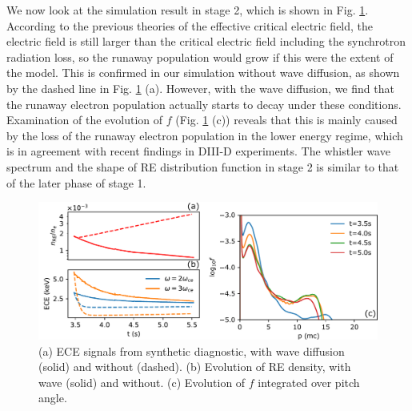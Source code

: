 \documentclass[aps, prl, preprint,english,superscriptaddress]{revtex4-1}
\begin{document}
We now look at the simulation result in stage 2, which is shown in Fig. \ref{fig:after}. According to the previous theories of the effective critical electric field\cite{stahl_effective_2015,aleynikov_theory_2015}, the electric field is still larger than the critical electric field including the synchrotron radiation loss, so the runaway population would grow if this were the extent of the model. This is confirmed in our simulation without wave diffusion, as shown by the dashed line in Fig. \ref{fig:after} (a). However, with the wave diffusion, we find that the runaway electron population actually starts to decay under these conditions. Examination of the evolution of $f$ (Fig. \ref{fig:after} (c)) reveals that this is mainly caused by the loss of the runaway electron population in the lower energy regime, which is in agreement with recent findings in DIII-D experiments\cite{paz-soldan_spatiotemporal_2017}.
The whistler wave spectrum and the shape of RE distribution function in stage 2 is similar to that of the later phase of stage 1.

\begin{figure}[h]
    \begin{center}
			\includegraphics[width=0.9\linewidth]{ECE-after}
    \end{center}
    \caption{\label{fig:after}(a) ECE signals from synthetic diagnostic, with wave diffusion (solid) and without (dashed). (b) Evolution of RE density, with wave (solid) and without. (c) Evolution of $f$ integrated over pitch angle. }
\end{figure}
\end{document}
